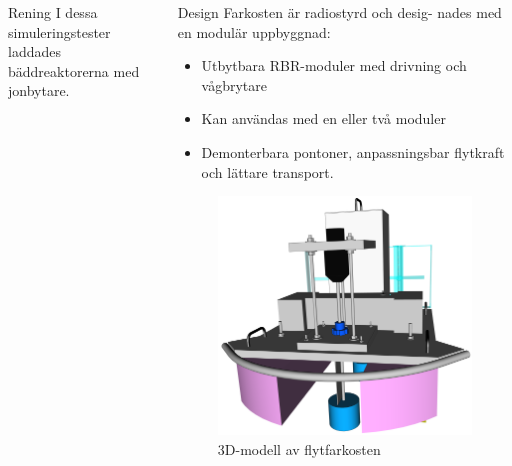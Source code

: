 \documentclass[final]{beamer}
\newlength{\onecolwid}
\begin{document}
\begin{frame}[t]
\begin{columns}[t, totalwidth=0.99\textwidth]
\begin{column}{\onecolwid}
\begin{block}{Rening}
        I dessa simuleringstester
        laddades bäddreaktorerna med jonbytare.

      \end{block}

    \end{column}

    \begin{column}{\onecolwid}

      \begin{block}{Design}
        Farkosten är radiostyrd och desig- nades med en modulär uppbyggnad:
          \begin{itemize}
          \item Utbytbara RBR-moduler med drivning och vågbrytare
          \item Kan användas med en eller två moduler
          \item Demonterbara pontoner, anpassningsbar flytkraft och lättare transport.
          \end{itemize}

        \vskip 4cm
        \begin{figure}[H]
          \centering
          \hbox{\hspace{-4cm}\includegraphics[width=25cm]{figures/front_rbr.png}}
          \caption{3D-modell av flytfarkosten}
        \end{figure}

      \end{block}


\end{column}
\end{columns}
\end{frame}
\end{document}
